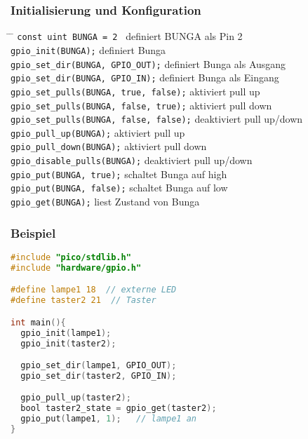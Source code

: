 \documentclass[a4paper,12pt,twoside]{article}
\begin{document}
\subsubsection{Initialisierung und Konfiguration}
\begin{tabbing}
	\hspace{5mm} \= \hspace{80mm} \= \kill
	\> \verb|const uint BUNGA = 2 | \> definiert BUNGA als Pin 2 \\
	\> \verb|gpio_init(BUNGA);| \> definiert Bunga \\
	\> \verb|gpio_set_dir(BUNGA, GPIO_OUT);| \> definiert Bunga als Ausgang \\
	\> \verb|gpio_set_dir(BUNGA, GPIO_IN);| \> definiert Bunga als Eingang \\
	\> \verb|gpio_set_pulls(BUNGA, true, false);| \> aktiviert pull up \\
	\> \verb|gpio_set_pulls(BUNGA, false, true);| \> aktiviert pull down \\
	\> \verb|gpio_set_pulls(BUNGA, false, false);| \> deaktiviert pull up/down \\
	\> \verb|gpio_pull_up(BUNGA);| \> aktiviert pull up \\
	\> \verb|gpio_pull_down(BUNGA);| \> aktiviert pull down \\
	\> \verb|gpio_disable_pulls(BUNGA);| \> deaktiviert pull up/down \\
	\> \verb|gpio_put(BUNGA, true);| \> schaltet Bunga auf high \\
	\> \verb|gpio_put(BUNGA, false);| \> schaltet Bunga auf low \\
	\> \verb|gpio_get(BUNGA);| \> liest Zustand von Bunga \\
\end{tabbing}
\subsubsection{Beispiel}
\begin{center}
	\begin{minipage}{1.0\textwidth}
		\begin{lstlisting}[language=C]
#include "pico/stdlib.h"
#include "hardware/gpio.h"

#define lampe1 18  // externe LED
#define taster2 21  // Taster

int main(){
  gpio_init(lampe1);
  gpio_init(taster2);

  gpio_set_dir(lampe1, GPIO_OUT);
  gpio_set_dir(taster2, GPIO_IN);

  gpio_pull_up(taster2);
  bool taster2_state = gpio_get(taster2);
  gpio_put(lampe1, 1);   // lampe1 an
}
	  \end{lstlisting}
	\end{minipage}
\end{center}
\end{document}

